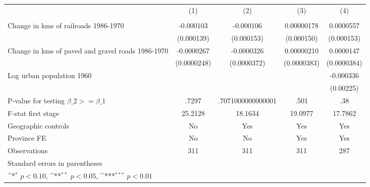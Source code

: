 {
\def\sym#1{\ifmmode^{#1}\else\(^{#1}\)\fi}
\begin{tabular}{l*{4}{c}}
\hline\hline
                &\multicolumn{1}{c}{(1)}&\multicolumn{1}{c}{(2)}&\multicolumn{1}{c}{(3)}&\multicolumn{1}{c}{(4)}\\
                &\multicolumn{1}{c}{}&\multicolumn{1}{c}{}&\multicolumn{1}{c}{}&\multicolumn{1}{c}{}\\
\hline
Change in kms of railroads 1986-1970&-0.000103         &-0.000106         &0.00000178         &0.0000557         \\
                &(0.000139)         &(0.000153)         &(0.000150)         &(0.000153)         \\
[1em]
Change in kms of paved and gravel roads 1986-1970&-0.0000267         &-0.0000326         &0.00000210         &0.0000147         \\
                &(0.0000248)         &(0.0000372)         &(0.0000383)         &(0.0000384)         \\
[1em]
Log urban population 1960&                  &                  &                  &-0.000336         \\
                &                  &                  &                  &(0.00225)         \\
\hline
P-value for testing $\beta\_{2} >= \beta\_{1}$&    .7297         &.7071000000000001         &     .501         &      .38         \\
F-stat first stage&  25.2128         &  18.1634         &  19.0977         &  17.7862         \\
Geographic controls&       No         &      Yes         &      Yes         &      Yes         \\
Province FE     &       No         &       No         &      Yes         &      Yes         \\
Observations    &      311         &      311         &      311         &      287         \\
\hline\hline
\multicolumn{5}{l}{\footnotesize Standard errors in parentheses}\\
\multicolumn{5}{l}{\footnotesize \sym{*} \(p<0.10\), \sym{**} \(p<0.05\), \sym{***} \(p<0.01\)}\\
\end{tabular}
}
